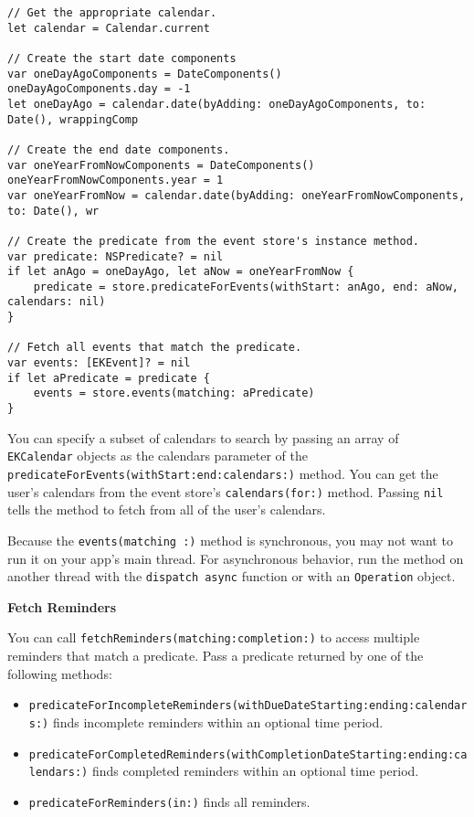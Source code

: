\documentclass{article}
\begin{document}
\begin{verbatim}
// Get the appropriate calendar.
let calendar = Calendar.current

// Create the start date components
var oneDayAgoComponents = DateComponents()
oneDayAgoComponents.day = -1
let oneDayAgo = calendar.date(byAdding: oneDayAgoComponents, to: Date(), wrappingComp

// Create the end date components.
var oneYearFromNowComponents = DateComponents()
oneYearFromNowComponents.year = 1
var oneYearFromNow = calendar.date(byAdding: oneYearFromNowComponents, to: Date(), wr

// Create the predicate from the event store's instance method.
var predicate: NSPredicate? = nil
if let anAgo = oneDayAgo, let aNow = oneYearFromNow {
    predicate = store.predicateForEvents(withStart: anAgo, end: aNow, calendars: nil)
}

// Fetch all events that match the predicate.
var events: [EKEvent]? = nil
if let aPredicate = predicate {
    events = store.events(matching: aPredicate)
}
\end{verbatim}

You can specify a subset of calendars to search by passing an array of \texttt{EKCalendar} objects as the calendars parameter of the \texttt{predicateForEvents(withStart:end:calendars:)} method. You can get the user's calendars from the event store's \texttt{calendars(for:)} method. Passing \texttt{nil} tells the method to fetch from all of the user's calendars.

Because the \texttt{events(matching :)} method is synchronous, you may not want to run it on your app's main thread. For asynchronous behavior, run the method on another thread with the \texttt{dispatch async} function or with an \texttt{Operation} object.

\textbf{Fetch Reminders}

You can call \texttt{fetchReminders(matching:completion:)} to access multiple reminders that match a predicate. Pass a predicate returned by one of the following methods:

\begin{itemize}
    \item \texttt{predicateForIncompleteReminders(withDueDateStarting:ending:calendars:)} finds incomplete reminders within an optional time period.
    \item \texttt{predicateForCompletedReminders(withCompletionDateStarting:ending:calendars:)} finds completed reminders within an optional time period.
    \item \texttt{predicateForReminders(in:)} finds all reminders.
\end{itemize}
\end{document}

